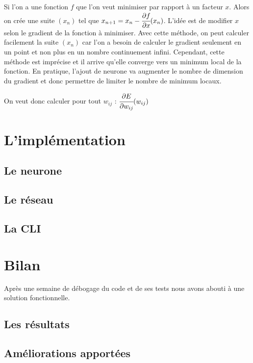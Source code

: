 Si l'on a une fonction $f$ que l'on veut minimiser par rapport à un facteur $x$. Alors on crée une suite $(x_n)$ tel que $x_{n+1} = x_{n} - \cfrac{\partial f}{\partial x}(x_n)$. L'idée est de modifier $x$ selon le gradient de la fonction à minimiser. Avec cette méthode, on peut calculer facilement la suite $(x_n)$ car l'on a besoin de calculer le gradient seulement en un point et non plus en un nombre continuement infini. Cependant, cette méthode est imprécise et il arrive qu'elle converge vers un minimum local de la fonction. En pratique, l'ajout de neurone va augmenter le nombre de dimension du gradient et donc permettre de limiter le nombre de minimum locaux.

On veut donc calculer pour tout $w_{ij}$ : $\cfrac{\partial E}{\partial w_{ij}}(w_{ij})$



\section{L'implémentation}

\subsection{Le neurone}

\subsection{Le réseau}

\subsection{La CLI}

\section{Bilan}

Après une semaine de débogage du code et de ses tests nous avons abouti à une solution fonctionnelle.

\subsection{Les résultats}

\subsection{Améliorations apportées}


